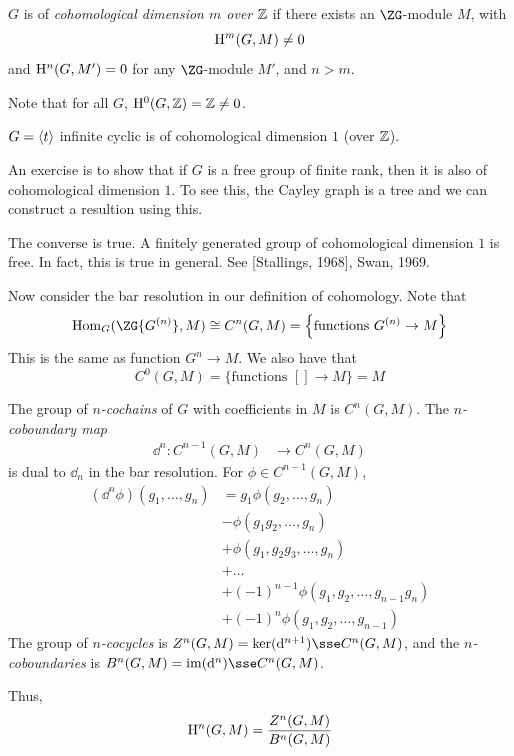 \documentclass{article}
\begin{document}
\begin{definition}
    \(G\) is of \emph{cohomological dimension \(m\) over \(\mathbb{Z}\)} if there exists an \(\ZG\)-module \(M\), with 
    \[\mathrm{H}^m(G, M) \ne 0\]
    and \(\mathrm{H}^n(G, M') = 0\) for any \(\ZG\)-module \(M'\), and \(n > m\). 
\end{definition}

Note that for all \(G\), \(\mathrm{H}^0(G, \mathbb{Z}) = \mathbb{Z} \ne 0\).

\begin{example}
    \(G = \left\langle t \right\rangle\) infinite cyclic is of cohomological dimension \(1\) (over \(\mathbb{Z}\)).

    An exercise is to show that if \(G\) is a free group of finite rank, then it is also of cohomological dimension \(1\). To see this, the Cayley graph is a tree and we can construct a resultion using this.
\end{example}

\begin{remark}
    The converse is true. A finitely generated group of cohomological dimension \(1\) is free. In fact, this is true in general. See [Stallings, 1968], {Swan, 1969}.
\end{remark}

Now consider the bar resolution in our definition of cohomology. Note that
\[\Hom_G(\ZG\{G^{(n)}\}, M) \cong C^n(G, M) = \left\{\text{functions }G^{(n)} \to M\right\}\]
This is the same as function \(G^n \to M\). We also have that
\[C^0(G, M) = \{\text{functions }[] \to M\} = M\]

\begin{definition}
    The group of \emph{\(n\)-cochains} of \(G\) with coefficients in \(M\) is \(C^n(G, M)\). The \emph{\(n\)-coboundary map}
    \begin{align*}
        \dd^n : C^{n-1}(G, M) &\to C^n(G, M)
    \end{align*}
    is dual to \(\dd_n\) in the bar resolution. For \(\phi \in C^{n-1}(G, M)\),
    \begin{align*}
        (\dd^n\phi)(g_1, \dots, g_n) &= g_1\phi(g_2, \dots, g_n) \\
        &- \phi(g_1g_2, \dots, g_n) \\
        &+\phi(g_1, g_2g_3, \dots, g_n) \\
        &+ \dots \\
        &+(-1)^{n-1}\phi(g_1, g_2, \dots, g_{n-1}g_n) \\
        &+(-1)^n\phi(g_1, g_2, \dots, g_{n-1})
    \end{align*}
    The group of \emph{\(n\)-cocycles} is \(Z^n(G, M) = \ker(\dd^{n+1}) \sse C^n(G, M)\), and the \emph{\(n\)-coboundaries} is \(B^n(G, M) = \im(\dd^n) \sse C^n(G, M)\).
\end{definition}
Thus,
\[\mathrm{H}^n(G, M) = \frac{Z^n(G, M)}{B^n(G, M)}\]
\end{document}
